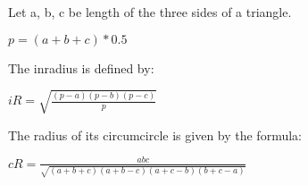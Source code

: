 Let a, b, c be length of the three sides of a triangle.

$ p = (a + b + c) * 0.5 $

The inradius is defined by:

$ iR = \sqrt{\frac{(p - a)(p - b)(p - c)}{p}}$

The radius of its circumcircle is given by the formula:

$ cR = \frac{abc}{\sqrt{(a + b + c)(a + b - c)(a + c - b)(b + c - a)}}$
